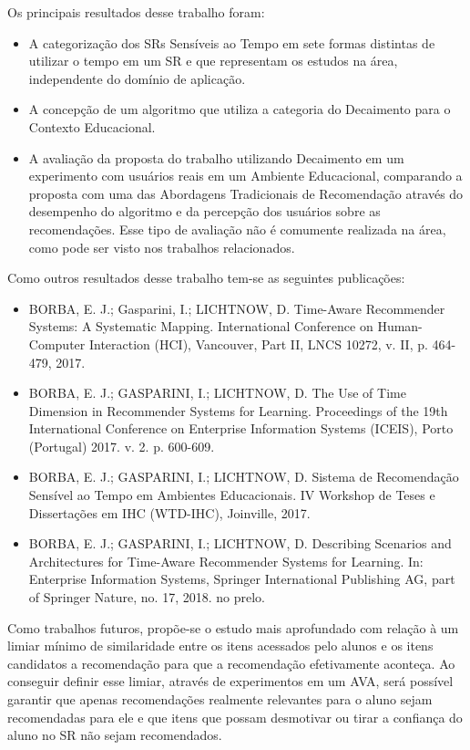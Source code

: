 Os principais resultados desse trabalho foram:

\begin{itemize}
\item A categorização dos SRs Sensíveis ao Tempo em sete formas distintas de utilizar o tempo em um SR e que representam
os estudos na área, independente do domínio de aplicação.
\item A concepção de um algoritmo que utiliza a categoria do Decaimento para o Contexto Educacional.
\item A avaliação da proposta do trabalho utilizando Decaimento em um experimento com usuários reais em um Ambiente Educacional,
comparando a proposta com uma das Abordagens Tradicionais de Recomendação através do desempenho do algoritmo e da percepção
dos usuários sobre as recomendações. Esse tipo de avaliação não é comumente realizada na área, como pode ser visto nos
trabalhos relacionados.
\end{itemize}

Como outros resultados desse trabalho tem-se as seguintes publicações:

\begin{itemize}
\item BORBA, E. J.; Gasparini, I.; LICHTNOW, D. Time-Aware Recommender Systems: A Systematic Mapping. International Conference on Human-Computer Interaction (HCI), Vancouver, Part II, LNCS 10272, v. II, p. 464-479, 2017.
\item BORBA, E. J.; GASPARINI, I.; LICHTNOW, D. The Use of Time Dimension in Recommender Systems for Learning. Proceedings of the 19th International Conference on Enterprise Information Systems (ICEIS), Porto (Portugal) 2017. v. 2. p. 600-609.
\item BORBA, E. J.; GASPARINI, I.; LICHTNOW, D. Sistema de Recomendação Sensível ao Tempo em Ambientes Educacionais. IV Workshop de Teses e Dissertações em IHC (WTD-IHC), Joinville, 2017.
\item BORBA, E. J.; GASPARINI, I.; LICHTNOW, D. Describing Scenarios and Architectures for Time-Aware Recommender Systems for Learning. In: Enterprise Information Systems, Springer International Publishing AG, part of Springer Nature, no. 17, 2018. no prelo.
\end{itemize}

Como trabalhos futuros, propõe-se o estudo mais aprofundado com relação à um limiar mínimo de similaridade entre os itens
acessados pelo alunos e os itens candidatos a recomendação para que a recomendação efetivamente aconteça. Ao conseguir
definir esse limiar, através de experimentos em um AVA, será possível garantir que apenas recomendações realmente relevantes
para o aluno sejam recomendadas para ele e que itens que possam desmotivar ou tirar a confiança do aluno no SR não
sejam recomendados.

